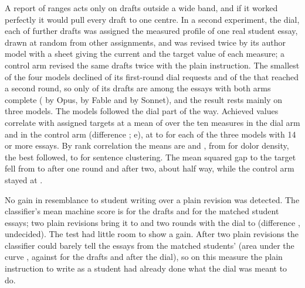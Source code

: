 {A report of ranges acts only on drafts outside a wide band, and if it worked perfectly it would pull every draft to one centre. In a second experiment, the dial, each of \dlRequested{} further drafts was assigned the measured profile of one real student essay, drawn at random from other assignments, and was revised twice by its author model with a sheet giving the current and the target value of each measure; a control arm revised the same drafts twice with the plain instruction. The smallest of the four models declined \dcDialFirst{} of its \hkDialFirst{} first-round dial requests and \dcDialSecond{} of the \hkDialSecond{} that reached a second round, so only \hkPairs{} of its drafts are among the \dlN{} essays with both arms complete (\dlPairsOpus{} by Opus, \dlPairsFable{} by Fable and \dlPairsSonnet{} by Sonnet), and the result rests mainly on three models. The models followed the dial part of the way. Achieved values correlate with assigned targets at a mean of \dlCorrDial{} over the ten measures in the dial arm and \dlCorrControl{} in the control arm (difference \dDlCorr{} \dDlCorrCIjack; e), at \dlCorrModelLo{} to \dlCorrModelHi{} for each of the three models with 14 or more essays. By rank correlation the means are \dlRhoDial{} and \dlRhoControl, from \dlRhoMax{} for dolor density, the best followed, to \dlRhoMin{} for sentence clustering. The mean squared gap to the target fell from \dlGapDraft{} to \dlGapDialOne{} after one round and \dlGapDial{} after two, about half way, while the control arm stayed at \dlGapControl.

No gain in resemblance to student writing over a plain revision was detected. The classifier's mean machine score is \dlScoreDraft{} for the drafts and \dlScoreHuman{} for the matched student essays; two plain revisions bring it to \dlScoreControl{} and two rounds with the dial to \dlScoreDial{} (difference \dDlScore{} \dDlScoreCIjack, undecided). The test had little room to show a gain. After two plain revisions the classifier could barely tell the essays from the matched students' (area under the curve \dlAucControl, against \dlAucDraft{} for the drafts and \dlAucDial{} after the dial), so on this measure the plain instruction to write as a student had already done what the dial was meant to do.

}
